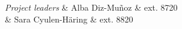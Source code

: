 \emph{Project leaders} & Alba Diz-Mu\~noz & ext. 8720\\
		       & Sara Cyulen-H\"aring & ext. 8820 \\	
